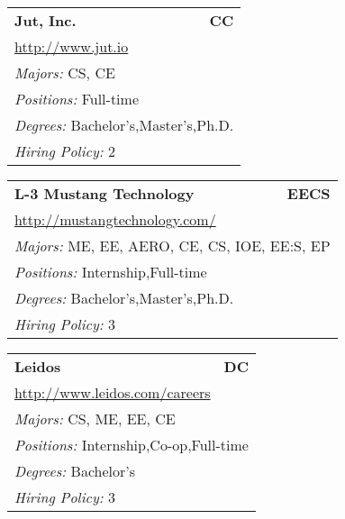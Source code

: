\documentclass[twoside]{article}
\begin{document}
\begin{center}
\begin{multicols}{3}
\begin{FlushLeft}
\begin{minipage}{\columnwidth}
\end{minipage}
 
\begin{minipage}{\columnwidth}\begin{tabularx}{.95\columnwidth}{Xr}
                 {\Large\bf Jut, Inc.} & {\Large\bf CC}\\
    \multicolumn{2}{p{.95\columnwidth}}{\url{http://www.jut.io}}\\
    \multicolumn{2}{p{.95\columnwidth}}{\emph{Majors:} CS, CE}\\
    \multicolumn{2}{p{.95\columnwidth}}{\emph{Positions:} Full-time}\\
    \multicolumn{2}{p{.95\columnwidth}}{\emph{Degrees:} Bachelor's,Master's,Ph.D.}\\
    \multicolumn{2}{p{.95\columnwidth}}{\emph{Hiring Policy:} 2}\\
    \end{tabularx}
    
\end{minipage}
 
\begin{minipage}{\columnwidth}\begin{tabularx}{.95\columnwidth}{Xr}
                 {\Large\bf L-3 Mustang Technology} & {\Large\bf EECS}\\
    \multicolumn{2}{p{.95\columnwidth}}{\url{http://mustangtechnology.com/}}\\
    \multicolumn{2}{p{.95\columnwidth}}{\emph{Majors:} ME, EE, AERO, CE, CS, IOE, EE:S, EP}\\
    \multicolumn{2}{p{.95\columnwidth}}{\emph{Positions:} Internship,Full-time}\\
    \multicolumn{2}{p{.95\columnwidth}}{\emph{Degrees:} Bachelor's,Master's,Ph.D.}\\
    \multicolumn{2}{p{.95\columnwidth}}{\emph{Hiring Policy:} 3}\\
    \end{tabularx}
    
\end{minipage}
 
\begin{minipage}{\columnwidth}\begin{tabularx}{.95\columnwidth}{Xr}
                 {\Large\bf Leidos} & {\Large\bf DC}\\
    \multicolumn{2}{p{.95\columnwidth}}{\url{http://www.leidos.com/careers}}\\
    \multicolumn{2}{p{.95\columnwidth}}{\emph{Majors:} CS, ME, EE, CE}\\
    \multicolumn{2}{p{.95\columnwidth}}{\emph{Positions:} Internship,Co-op,Full-time}\\
    \multicolumn{2}{p{.95\columnwidth}}{\emph{Degrees:} Bachelor's}\\
    \multicolumn{2}{p{.95\columnwidth}}{\emph{Hiring Policy:} 3}\\
    \end{tabularx}
    

\end{minipage}
\end{FlushLeft}
\end{multicols}
\end{center}
\end{document}
